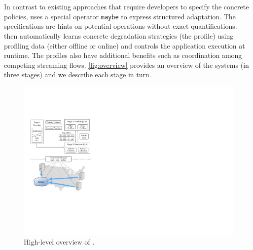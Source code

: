 \section{\sysname{}}
\label{sec:system}

In contrast to existing approaches that require developers to specify the
concrete policies, \sysname{} uses a special operator \texttt{maybe} to express
structured adaptation. The specifications are hints on potential operations
without exact quantifications. \sysname{} then automatically learns concrete
degradation strategies (the profile) using profiling data (either offline or
online) and controls the application execution at runtime. The profiles also
have additional benefits such as coordination among competing streaming
flows. \autoref{fig:overview} provides an overview of the systems (in three
stages) and we describe each stage in turn.

\begin{figure}
  \centering
  \includegraphics[width=.9\linewidth]{figures/system.pdf}
  \caption{High-level overview of \sysname{}.}
  \label{fig:overview}
\end{figure}





